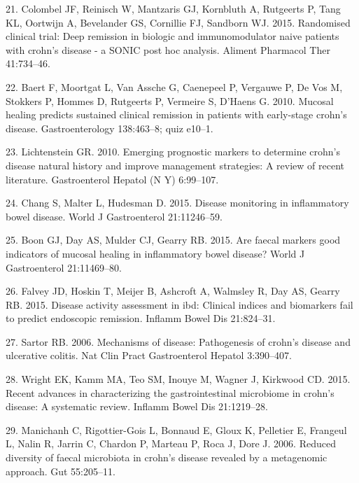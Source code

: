 \documentclass[12pt,]{article}
\begin{document}
\hypertarget{ref-colombel_deepremission_2015}{}
21. Colombel JF, Reinisch W, Mantzaris GJ, Kornbluth A, Rutgeerts P,
Tang KL, Oortwijn A, Bevelander GS, Cornillie FJ, Sandborn WJ. 2015.
Randomised clinical trial: Deep remission in biologic and
immunomodulator naive patients with crohn's disease - a SONIC post hoc
analysis. Aliment Pharmacol Ther 41:734--46.

\hypertarget{ref-baert_mucosalhealing_2010}{}
22. Baert F, Moortgat L, Van Assche G, Caenepeel P, Vergauwe P, De Vos
M, Stokkers P, Hommes D, Rutgeerts P, Vermeire S, D'Haens G. 2010.
Mucosal healing predicts sustained clinical remission in patients with
early-stage crohn's disease. Gastroenterology 138:463--8; quiz e10--1.

\hypertarget{ref-Lichtenstein_biomarkers_2010}{}
23. Lichtenstein GR. 2010. Emerging prognostic markers to determine
crohn's disease natural history and improve management strategies: A
review of recent literature. Gastroenterol Hepatol (N Y) 6:99--107.

\hypertarget{ref-Chang_biomarkers_2015}{}
24. Chang S, Malter L, Hudesman D. 2015. Disease monitoring in
inflammatory bowel disease. World J Gastroenterol 21:11246--59.

\hypertarget{ref-Boon_biomarkers_2015}{}
25. Boon GJ, Day AS, Mulder CJ, Gearry RB. 2015. Are faecal markers good
indicators of mucosal healing in inflammatory bowel disease? World J
Gastroenterol 21:11469--80.

\hypertarget{ref-Falvey_biomarkers_2015}{}
26. Falvey JD, Hoskin T, Meijer B, Ashcroft A, Walmsley R, Day AS,
Gearry RB. 2015. Disease activity assessment in ibd: Clinical indices
and biomarkers fail to predict endoscopic remission. Inflamm Bowel Dis
21:824--31.

\hypertarget{ref-sartor_IBDpath_2006}{}
27. Sartor RB. 2006. Mechanisms of disease: Pathogenesis of crohn's
disease and ulcerative colitis. Nat Clin Pract Gastroenterol Hepatol
3:390--407.

\hypertarget{ref-wright_CDmicrobiome_2015}{}
28. Wright EK, Kamm MA, Teo SM, Inouye M, Wagner J, Kirkwood CD. 2015.
Recent advances in characterizing the gastrointestinal microbiome in
crohn's disease: A systematic review. Inflamm Bowel Dis 21:1219--28.

\hypertarget{ref-manichanh_diversityCD_2006}{}
29. Manichanh C, Rigottier-Gois L, Bonnaud E, Gloux K, Pelletier E,
Frangeul L, Nalin R, Jarrin C, Chardon P, Marteau P, Roca J, Dore J.
2006. Reduced diversity of faecal microbiota in crohn's disease revealed
by a metagenomic approach. Gut 55:205--11.
\end{document}
